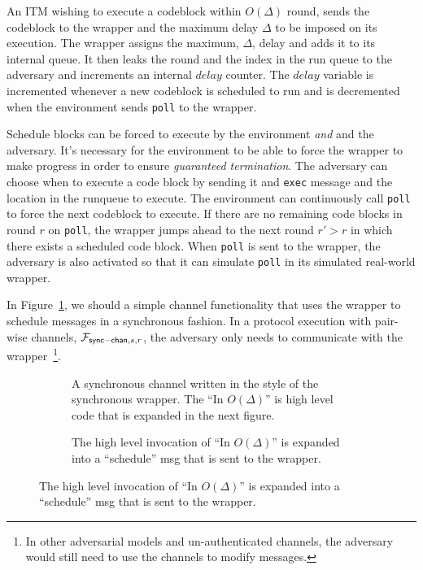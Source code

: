 
An ITM wishing to execute a codeblock within $O(\Delta)$ round, sends the codeblock to the wrapper and the maximum delay $\Delta$ to be imposed on its execution.
The wrapper assigns the maximum, $\Delta$, delay and adds it to its internal queue.
It then leaks the round and the index in the run queue to the adversary and increments an internal $delay$ counter.
The $delay$ variable is incremented whenever a new codeblock is scheduled to run and is decremented when the environment sends \texttt{poll} to the wrapper.

Schedule blocks can be forced to execute by the environment \emph{and} and the adversary.
It's necessary for the environment to be able to force the wrapper to make progress in order to ensure \emph{guaranteed termination}.
The adversary can choose when to execute a code block by sending it and \texttt{exec} message and the location in the runqueue to execute.
The environment can continuously call \texttt{poll} to force the next codeblock to execute.
If there are no remaining code blocks in round $r$ on \texttt{poll}, the wrapper jumps ahead to the next round $r' > r$ in which there exists a scheduled code block.
When \texttt{poll} is sent to the wrapper, the adversary is also activated so that it can simulate \texttt{poll} in its simulated real-world wrapper.

In Figure~\ref{fig:functionality:channel}, we should a simple channel functionality that uses the wrapper to schedule messages in a synchronous fashion.
In a protocol execution with pair-wise channels, $\mathcal{F}_{{\mathsf {sync-chan}},s,r}$, the adversary only needs to communicate with the wrapper~\footnote{In other adversarial models and un-authenticated channels, the adversary would still need to use the channels to modify messages.}.

\begin{figure}[!htb]
\begin{subfigure}{\textwidth}
	
	\caption{A synchronous channel written in the style of the synchronous wrapper. The ``In $O(\Delta)$'' is high level code that is expanded in the next figure.}
	\label{fig:functionality:channel}
\end{subfigure}
\begin{subfigure}{\textwidth}
	
	\caption{The high level invocation of ``In $O(\Delta)$'' is expanded into a ``schedule'' msg that is sent to the wrapper.}
\end{subfigure}
\end{figure}

